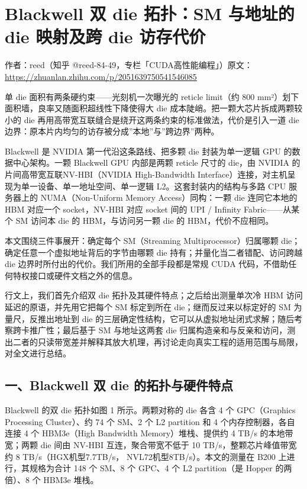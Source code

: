 \chapter{Blackwell 双 die 拓扑：SM 与地址的 die 映射及跨 die 访存代价}

\begin{center}\small 作者：reed（知乎 @reed-84-49，专栏「CUDA高性能编程」）\quad 原文：\url{https://zhuanlan.zhihu.com/p/2051639750541546085}\end{center}

单 die 面积有两条硬约束——光刻机一次曝光的 reticle limit（约 800 mm²）划下面积墙，良率又随面积超线性下降使得大 die 成本陡峭。把一颗大芯片拆成两颗较小的 die 再用高带宽互联缝合是绕开这两条约束的标准做法，代价是引入一道 die 边界：原本片内均匀的访存被分成”本地”与”跨边界”两种。

Blackwell 是 NVIDIA 第一代沿这条路线、把多颗 die 封装为单一逻辑 GPU 的数据中心架构。一颗 Blackwell GPU 内部是两颗 reticle 尺寸的 die，由 NVIDIA 的片间高带宽互联NV-HBI（NVIDIA High-Bandwidth Interface）连接，对主机呈现为单一设备、单一地址空间、单一逻辑 L2。这套封装内的结构与多路 CPU 服务器上的 NUMA（Non-Uniform Memory Access）同构：一颗 die 连同它本地的 HBM 对应一个 socket，NV-HBI 对应 socket 间的 UPI / Infinity Fabric——从某个 SM 访问本 die 的 HBM，与访问另一颗 die 的 HBM，代价不应相同。

本文围绕三件事展开：确定每个 SM（Streaming Multiprocessor）归属哪颗 die；确定任意一个虚拟地址背后的字节由哪颗 die 持有；并量化当二者错配、访问跨越 die 边界时所付出的代价。我们所用的全部手段都是常规 CUDA 代码，不借助任何特权接口或硬件文档之外的信息。

行文上，我们首先介绍双 die 拓扑及其硬件特点；之后给出测量单次冷 HBM 访问延迟的原语，并先用它把每个 SM 标定到所在 die；继而反过来以标定好的 SM 为量尺，反推出地址到 die 的三层确定性结构，它可以从虚拟地址闭式求解；随后考察跨卡推广性；最后基于 SM 与地址这两套 die 归属构造亲和与反亲和访问，测出二者的只读带宽差并解释其放大机理，再讨论走向真实工程的适用范围与局限，对全文进行总结。

\section{一、Blackwell 双 die 的拓扑与硬件特点}

Blackwell 的双 die 拓扑如图 1 所示。两颗对称的 die 各含 4 个 GPC（Graphics Processing Cluster）、约 74 个 SM、2 个 L2 partition 和 4 个内存控制器，各自连接 4 个 HBM3e（High Bandwidth Memory）堆栈、提供约 4 TB/s 的本地带宽；两颗 die 间由 NV-HBI 互连，聚合带宽不低于 10 TB/s，整颗芯片峰值带宽约 8 TB/s（HGX机型7.7TB/s， NVL72机型8TB/s）。本文的测量在 B200 上进行，其规格为合计 148 个 SM、8 个 GPC、4 个 L2 partition（是 Hopper 的两倍）、8 个 HBM3e 堆栈。

